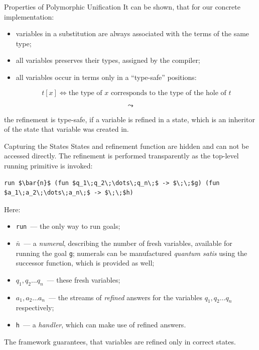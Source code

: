 \documentclass[10pt, mathserif]{beamer}
\theoremstyle{definition}
\begin{document}
\begin{frame}[fragile]{Properties of Polymorphic Unification}
It can be shown, that for our concrete implementation:\pause

\begin{itemize}
\item variables in a substitution are always associated with the terms of the same type;\pause
\item all variables preserves their types, assigned by the compiler;\pause
\item all variables occur in terms only in a ``type-safe'' positions:

$$
t[x] \iff \mbox{the type of }x\mbox{ corresponds to the type of the hole of }t 
$$ 
\end{itemize}\pause

$$\leadsto$$

the refinement is type-safe, if a variable is refined in a state, which is an inheritor
of the state that variable was created in.
\end{frame}

\begin{frame}[fragile]{Capturing the States}
States and refinement function are hidden and can not be accessed directly.\pause
\vskip3mm
The refinement is performed transparently as the top-level running primitive
is invoked:\pause
\vskip3mm
\begin{lstlisting}[mathescape=true]
    run $\bar{n}$ (fun $q_1\;q_2\;\dots\;q_n\;$ -> $\;\;$g) (fun $a_1\;a_2\;\dots\;a_n\;$ -> $\;\;$h)
\end{lstlisting}\pause

Here:\pause
{\small
\begin{itemize}
\item \lstinline{run}~--- the only way to run goals;\pause
\item $\bar{n}$~--- a \emph{numeral}, describing the number of fresh variables, 
available for running the goal \lstinline{g}; numerals can be manufactured
\emph{quantum satis} using the successor function, which is provided as well;\pause
\item $q_1, q_2\dots q_n$~--- these fresh variables;\pause
\item $a_1, a_2\dots a_n$~--- the streams of \emph{refined} answers for the variables
$q_1, q_2\dots q_n$ respectively;\pause
\item \lstinline{h}~--- a \emph{handler}, which can make use of refined answers.\pause
\end{itemize}
}

The framework guarantees, that variables are refined only in correct states.

\end{frame}
\end{document}

